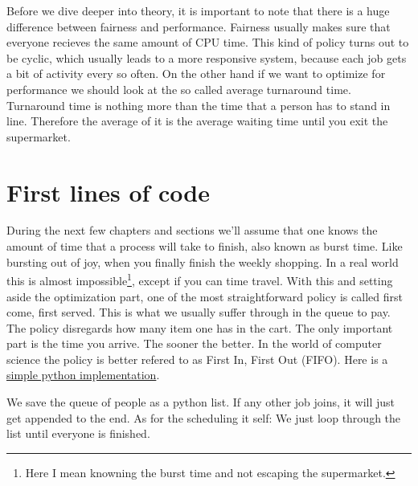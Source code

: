 Before we dive deeper into theory, it is important to note that there is a huge difference between fairness and performance.
Fairness usually makes sure that everyone recieves the same amount of CPU time.
This kind of policy turns out to be cyclic, which usually leads to a more responsive system, because each job gets a bit of activity every so often.
On the other hand if we want to optimize for performance we should look at the so called average turnaround time.
Turnaround time is nothing more than the time that a person has to stand in line.
Therefore the average of it is the average waiting time until you exit the supermarket.

\section{First lines of code} \label{sec:first-lines-of-code}

During the next few chapters and sections we'll assume that one knows the amount of time that a process will take to finish, also known as burst time.
Like bursting out of joy, when you finally finish the weekly shopping.
In a real world this is almost impossible\footnote{Here I mean knowning the burst time and not escaping the supermarket.}, except if you can time travel.
With this and setting aside the optimization part, one of the most straightforward policy is called first come, first served.
This is what we usually suffer through in the queue to pay.
The policy disregards how many item one has in the cart.
The only important part is the time you arrive.
The sooner the better.
In the world of computer science the policy is better refered to as First In, First Out (FIFO).
Here is a \hyperref[code:fifo]{simple python implementation}.

We save the queue of people as a python list.
If any other job joins, it will just get appended to the end.
As for the scheduling it self:
We just loop through the list until everyone is finished.

